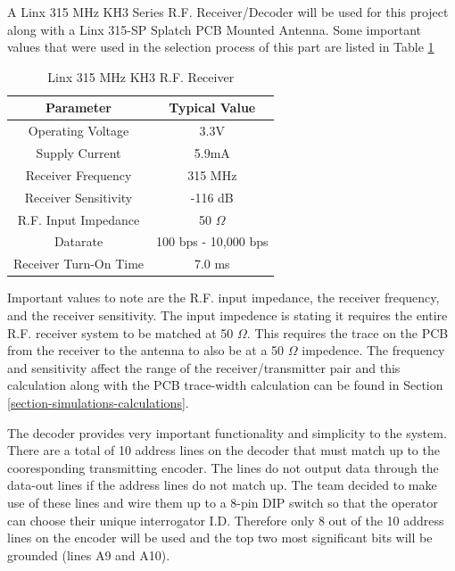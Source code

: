 \documentclass[letterpaper,10pt]{article}
\begin{document}
\begin{spacing}{1.15}
A Linx 315 MHz KH3 Series R.F. Receiver/Decoder will be used for this project along with a Linx 315-SP Splatch PCB Mounted Antenna. Some important values that were used in the selection process of this part are listed in Table \ref{tab:rf-receiver-important-values}

\begin{table}[htbp]
	\centering
	\begin{tabular}{c|c}	%
		\toprule	%
		Parameter & Typical Value \\
		\midrule
		Operating Voltage & 3.3V\\
		Supply Current & 5.9mA\\
		Receiver Frequency & 315 MHz \\ 
		Receiver Sensitivity & -116 dB \\
		R.F. Input Impedance & 50 $\Omega$ \\
		Datarate & 100 bps - 10,000 bps  \\
		Receiver Turn-On Time & 7.0 ms  \\
		\bottomrule	%
	\end{tabular}%
	\caption{Linx 315 MHz KH3 R.F. Receiver}
	\label{tab:rf-receiver-important-values}	%
\end{table}%

Important values to note are the R.F. input impedance, the receiver frequency, and the receiver sensitivity. The input impedence is stating it requires the entire R.F. receiver system to be matched at 50 $\Omega$. This requires the trace on the PCB from the receiver to the antenna to also be at a 50 $\Omega$ impedence. The frequency and sensitivity affect the range of the receiver/transmitter pair and this calculation along with the PCB trace-width calculation can be found in Section \ref{section-simulations-calculations}.

The decoder provides very important functionality and simplicity to the system. There are a total of 10 address lines on the decoder that must match up to the cooresponding transmitting encoder. The lines do not output data through the data-out lines if the address lines do not match up. The team decided to make use of these lines and wire them up to a 8-pin DIP switch so that the operator can choose their unique interrogator I.D. Therefore only 8 out of the 10 address lines on the encoder will be used and the top two most significant bits will be grounded (lines A9 and A10).


\end{spacing}
\end{document}
